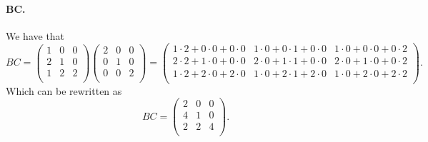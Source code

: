 \paragraph{BC.} We have that
\[ 
BC = \begin{pmatrix}
1 & 0 & 0\\
2 & 1 & 0\\
1 & 2 & 2\\
\end{pmatrix} \begin{pmatrix}
2 & 0 & 0\\
0 & 1 & 0\\
0 & 0 & 2\\
\end{pmatrix} = \begin{pmatrix}
1 \cdot 2 + 0 \cdot 0 + 0 \cdot 0 & 1 \cdot 0 + 0 \cdot 1 + 0 \cdot 0 & 1 \cdot 0 + 0 \cdot 0 + 0 \cdot 2\\
2 \cdot 2 + 1 \cdot 0 + 0 \cdot 0 & 2 \cdot 0 + 1 \cdot 1 + 0 \cdot 0 & 2 \cdot 0 + 1 \cdot 0 + 0 \cdot 2\\
1 \cdot 2 + 2 \cdot 0 + 2 \cdot 0 & 1 \cdot 0 + 2 \cdot 1 + 2 \cdot 0 & 1 \cdot 0 + 2 \cdot 0 + 2 \cdot 2\\
\end{pmatrix}
.\]
Which can be rewritten as
\[ 
BC = \begin{pmatrix}
2 & 0 & 0\\
4 & 1 & 0\\
2 & 2 & 4\\
\end{pmatrix}
.\]

